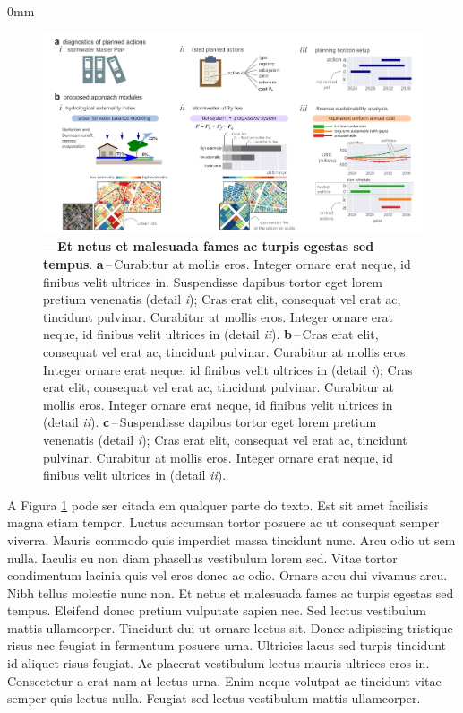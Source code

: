 \documentclass[./main.tex]{subfiles}
\begin{document}
\begin{adjustwidth}{\bodytab}{0mm}
\begin{figure}[t!] %
	\centering                                       
	\includegraphics[width=0.98\linewidth]{figs/fig_method.jpg}    
	\caption[Et netus et malesuada]
	{\textbf{---\;Et netus et malesuada fames ac turpis egestas sed tempus}.
		\textbf{a}\,--\,Curabitur at mollis eros. Integer ornare erat neque, id finibus velit ultrices in. Suspendisse dapibus tortor eget lorem pretium venenatis (detail \textrm{\textit{i}}); Cras erat elit, consequat vel erat ac, tincidunt pulvinar. Curabitur at mollis eros. Integer ornare erat neque, id finibus velit ultrices in (detail \textrm{\textit{ii}}).
		\textbf{b}\,--\,Cras erat elit, consequat vel erat ac, tincidunt pulvinar. Curabitur at mollis eros. Integer ornare erat neque, id finibus velit ultrices in (detail \textrm{\textit{i}}); Cras erat elit, consequat vel erat ac, tincidunt pulvinar. Curabitur at mollis eros. Integer ornare erat neque, id finibus velit ultrices in (detail \textrm{\textit{ii}}).
          \textbf{c}\,--\,Suspendisse dapibus tortor eget lorem pretium venenatis (detail \textrm{\textit{i}}); Cras erat elit, consequat vel erat ac, tincidunt pulvinar. Curabitur at mollis eros. Integer ornare erat neque, id finibus velit ultrices in (detail \textrm{\textit{ii}}).
	}
	\label{fig:fig_normal}  %
\end{figure}

\par A Figura \ref{fig:fig_normal} pode ser citada em qualquer parte do texto. Est sit amet facilisis magna etiam tempor. Luctus accumsan tortor posuere ac ut consequat semper viverra. Mauris commodo quis imperdiet massa tincidunt nunc. Arcu odio ut sem nulla. Iaculis eu non diam phasellus vestibulum lorem sed. Vitae tortor condimentum lacinia quis vel eros donec ac odio. Ornare arcu dui vivamus arcu. Nibh tellus molestie nunc non. Et netus et malesuada fames ac turpis egestas sed tempus. Eleifend donec pretium vulputate sapien nec. Sed lectus vestibulum mattis ullamcorper. Tincidunt dui ut ornare lectus sit. Donec adipiscing tristique risus nec feugiat in fermentum posuere urna. Ultricies lacus sed turpis tincidunt id aliquet risus feugiat. Ac placerat vestibulum lectus mauris ultrices eros in. Consectetur a erat nam at lectus urna. Enim neque volutpat ac tincidunt vitae semper quis lectus nulla. Feugiat sed lectus vestibulum mattis ullamcorper.


\end{adjustwidth}
\end{document}
